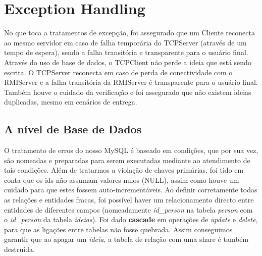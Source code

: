 \documentclass[12pt]{article} %
\begin{document}
\section{Exception Handling}
\label{sec:except}

No que toca a tratamentos de excepção, foi assegurado que um Cliente reconecta ao mesmo servidor em caso de falha temporária do TCPServer (através de um tempo de espera), sendo a falha transitória e transparente para o usuário final.
Através do uso de base de dados, o TCPClient não perde a ideia que está sendo escrita.
O TCPServer reconecta em caso de perda de conectividade com o RMIServer e 
a falha transitória da RMIServer é transparente para o usuário final.
Também houve o cuidado da verificação e foi assegurado que não existem ideias duplicadas, mesmo em cenários de entrega.

\subsection{A nível de Base de Dados}
O tratamento de erros do nosso MySQL é baseado em condições, que por sua vez, são nomeadas e preparadas para serem executadas mediante ao atendimento de tais condições. 
Além de tratarmos a violação de chaves primárias, foi tido em conta que os ids não assumam valores nulos (NULL), assim como houve um cuidado para que estes fossem auto-incrementáveis. Ao definir corretamente todas as relações e entidades fracas, foi possível haver um relacionamento directo entre entidades de diferentes campos (nomeadamente \emph{id\_person} na tabela \emph{person} com o \emph{id\_person} da tabela \emph{ideias}). Foi dado \textbf{cascade} em operações de \emph{update} e \emph{delete}, para que as ligações entre tabelas não fosse quebrada. Assim conseguimos garantir que ao apagar um \emph{ideia}, a tabela de relação com uma share é também destruída. 
\end{document}
